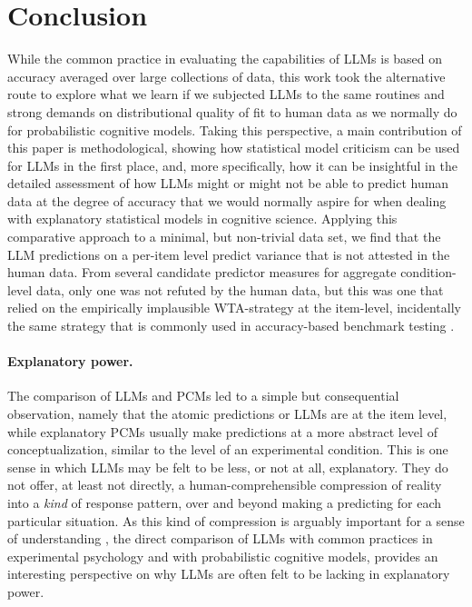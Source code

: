 \documentclass[fleqn]{article}
\begin{document}
\section{Conclusion}
\label{sec:conclusion}

While the common practice in evaluating the capabilities of LLMs is based on accuracy averaged over large collections of data, this work took the alternative route to explore what we learn if we subjected LLMs to the same routines and strong demands on distributional quality of fit to human data as we normally do for probabilistic cognitive models.
Taking this perspective, a main contribution of this paper is methodological, showing how statistical model criticism can be used for LLMs in the first place, and, more specifically, how it can be insightful in the detailed assessment of how LLMs might or might not be able to predict human data at the degree of accuracy that we would normally aspire for when dealing with explanatory statistical models in cognitive science.
Applying this comparative approach to a minimal, but non-trivial data set, we find that the LLM predictions on a per-item level predict variance that is not attested in the human data.
From several candidate predictor measures for aggregate condition-level data, only one was not refuted by the human data, but this was one that relied on the empirically implausible WTA-strategy at the item-level, incidentally the same strategy that is commonly used in accuracy-based benchmark testing \citep{srivastava2023-BIGbench}.

\paragraph{Explanatory power.}
The comparison of LLMs and PCMs led to a simple but consequential observation, namely that the atomic predictions or LLMs are at the item level, while explanatory PCMs usually make predictions at a more abstract level of conceptualization, similar to the level of an experimental condition.
This is one sense in which LLMs may be felt to be less, or not at all, explanatory.
They do not offer, at least not directly, a human-comprehensible compression of reality into a \emph{kind} of response pattern, over and beyond making a predicting for each particular situation.
As this kind of compression is arguably important for a sense of understanding \citep{Dellsen2020:Beyond-Explanat,Grimm2021:Understanding}, the direct comparison of LLMs with common practices in experimental psychology and with probabilistic cognitive models, provides an interesting perspective on why LLMs are often felt to be lacking in explanatory power.
\end{document}
